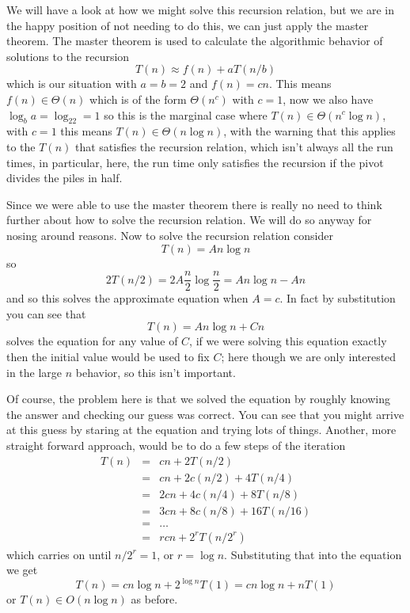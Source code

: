 \documentclass[11pt,a4paper]{scrartcl}
\begin{document}
We will have a look at how we might solve this recursion relation, but
we are in the happy position of not needing to do this, we can just
apply the master theorem. The master theorem is used to calculate the algorithmic behavior of solutions to the recursion
\begin{equation}
T(n)\approx f(n)+aT(n/b)
\end{equation}
which is our situation with $a=b=2$ and $f(n)=cn$. This means $f(n)\in
\Theta(n)$ which is of the form $\Theta(n^c)$ with $c=1$, now we also
have $\log_ba=\log_22=1$ so this is the marginal case where $T(n)\in
\Theta(n^c\log n)$, with $c=1$ this means $T(n)\in \Theta(n\log n)$,
with the warning that this applies to the $T(n)$ that satisfies the
recursion relation, which isn't always all the run times, in
particular, here, the run time only satisfies the recursion if the
pivot divides the piles in half.

Since we were able to use the master theorem there is really no need
to think further about how to solve the recursion relation. We will do
so anyway for nosing around reasons. Now to solve the recursion
relation consider
\begin{equation}
T(n)=An\log{n}
\end{equation}
so
\begin{equation}
2T(n/2)=2A\frac{n}{2}\log{\frac{n}{2}}=An\log{n}-An
\end{equation}
and so this solves the approximate equation when $A=c$. In fact by substitution you can see that
\begin{equation}
T(n)=An\log{n}+Cn
\end{equation}
solves the equation for any value of $C$, if we were solving this
equation exactly then the initial value would be used to fix $C$; here
though we are only interested in the large $n$ behavior, so this isn't
important.

Of course, the problem here is that we solved the equation by roughly
knowing the answer and checking our guess was correct. You can see
that you might arrive at this guess by staring at the equation and
trying lots of things. Another, more straight forward approach, would
be to do a few steps of the iteration
\begin{eqnarray}
T(n)&=&cn+2T(n/2)\\
    &=&cn+2c(n/2)+4T(n/4)\\
    &=&2cn+4c(n/4)+8T(n/8)\\
    &=&3cn+8c(n/8)+16T(n/16)\\
    &=&\ldots\\
    &=&rcn+2^rT(n/2^r)
\end{eqnarray}
which carries on until $n/2^r=1$, or $r=\log{n}$. Substituting that into the equation we get 
\begin{equation}
T(n)=cn\log{n}+2^{\log{n}}T(1)=cn\log{n}+nT(1)
\end{equation}
or $T(n)\in O(n\log{n})$ as before. 
\end{document}
